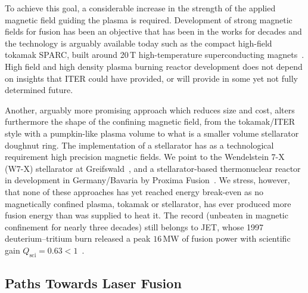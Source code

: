 \documentclass[particles,article,accept,pdftex,moreauthors]{Definitions/mdpi}
\begin{document}
To achieve this goal, a considerable increase in the strength of the applied magnetic field guiding the plasma is required. Development of strong magnetic fields for fusion has been an objective that has been in the works for decades and the technology is arguably available today such as the compact high-field tokamak SPARC, built around 20\,T high-temperature superconducting magnets~\cite{Creely:2020}. High field and high density plasma burning reactor development does not depend on insights that ITER could have provided, or will provide in some yet not fully determined future.

Another, arguably more promising approach which reduces size and cost, alters furthermore the shape of the confining magnetic field, from the tokamak/ITER style with a pumpkin-like plasma volume to what is a smaller volume stellarator doughnut ring. The implementation of a stellarator has as a technological requirement high precision magnetic fields. We point to the Wendelstein 7-X (\mbox{W7-X}) stellarator at Greifswald~\cite{Grulke:2024}, and a stellarator-based thermonuclear reactor in development in Germany/Bavaria by Proxima Fusion~\cite{Lion:2025}. We stress, however, that none of these approaches has yet reached energy break-even as no magnetically confined plasma, tokamak or stellarator, has ever produced more fusion energy than was supplied to heat it. The record (unbeaten in magnetic confinement for nearly three decades) still belongs to JET, whose 1997 deuterium--tritium burn released a peak $16\,\mathrm{MW}$ of fusion power with scientific gain $Q_\mathrm{sci}=0.63<1$~\cite{Keilhacker:1999,Wurzel:2025}.

 
\subsection{Paths Towards Laser Fusion}\label{ssec:INTlaserFusion}
\end{document}
